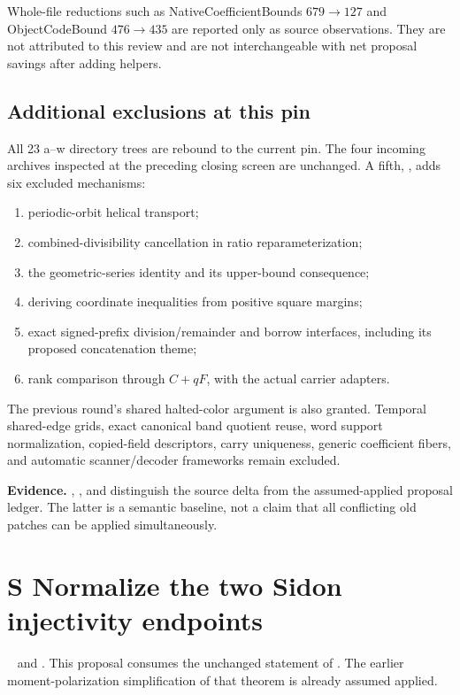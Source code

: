 Whole-file reductions such as NativeCoefficientBounds $679\to127$ and ObjectCodeBound $476\to435$ are reported only as source observations. They are not attributed to this review and are not interchangeable with net proposal savings after adding helpers.

\subsection{Additional exclusions at this pin}
All 23 a--w directory trees are rebound to the current pin. The four incoming archives inspected at the preceding closing screen are unchanged. A fifth, , adds six excluded mechanisms:
\begin{enumerate}
\item periodic-orbit helical transport;
\item combined-divisibility cancellation in ratio reparameterization;
\item the geometric-series identity and its upper-bound consequence;
\item deriving coordinate inequalities from positive square margins;
\item exact signed-prefix division/remainder and borrow interfaces, including its proposed concatenation theme;
\item rank comparison through $C+qF$, with the actual carrier adapters.
\end{enumerate}
The previous round's shared halted-color argument is also granted. Temporal shared-edge grids, exact canonical band quotient reuse, word support normalization, copied-field descriptors, carry uniqueness, generic coefficient fibers, and automatic scanner/decoder frameworks remain excluded.

\textbf{Evidence.} , , and  distinguish the source delta from the assumed-applied proposal ledger. The latter is a semantic baseline, not a claim that all conflicting old patches can be applied simultaneously.

\newpage
\section{S Normalize the two Sidon injectivity endpoints}
\  and . This proposal consumes the unchanged statement of . The earlier moment-polarization simplification of that theorem is already assumed applied.

